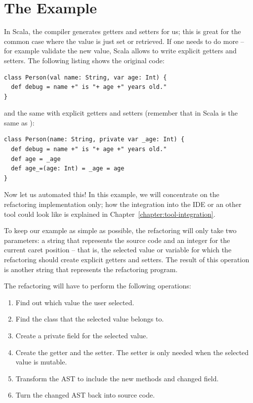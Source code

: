 \documentclass[10pt,a4paper,oneside]{scrreprt}
\begin{document}
\section{The Example}

In Scala, the compiler generates getters and setters for us; this is great for the common case where the value is just set or retrieved. If one needs to do more -- for example validate the new value, Scala allows to write explicit getters and setters. The following listing shows the original code:

\begin{lstlisting}
class Person(val name: String, var age: Int) {
  def debug = name +" is "+ age +" years old."
}
\end{lstlisting}

and the same with explicit getters and setters (remember that in Scala  is the same as ):

\begin{lstlisting}
class Person(name: String, private var _age: Int) {
  def debug = name +" is "+ age +" years old."
  def age = _age
  def age_=(age: Int) = _age = age
}
\end{lstlisting}

Now let us automated this! In this example, we will concentrate on the refactoring implementation only; how the integration into the IDE or an other tool could look like is explained in Chapter~\vref{chapter:tool-integration}.

To keep our example as simple as possible, the refactoring will only take two parameters: a string that represents the source code and an integer for the current caret position -- that is, the selected value or variable for which the refactoring should create explicit getters and setters. The result of this operation is another string that represents the refactoring program. 

The refactoring will have to perform the following operations:

\begin{enumerate}
  \item Find out which value the user selected.
  \item Find the class that the selected value belongs to.
  \item Create a private field for the selected value.
  \item Create the getter and the setter. The setter is only needed when the selected value is mutable.
  \item Transform the AST to include the new methods and changed field.
  \item Turn the changed AST back into source code.
\end{enumerate}
\end{document}
